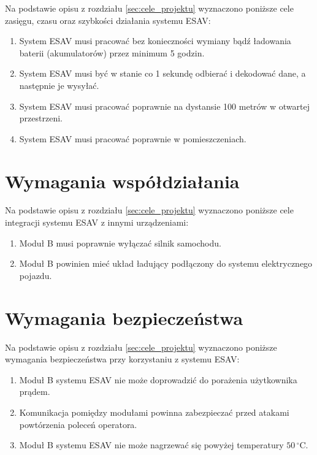 Na podstawie opisu z rozdziału \ref{sec:cele_projektu} wyznaczono poniższe cele zasięgu, czasu oraz szybkości działania systemu ESAV:

\begin{enumerate}[label=\thesection.\arabic{*}.,leftmargin=4em]
\item \label{wym_uzyt1} System ESAV musi pracować bez konieczności wymiany bądź ładowania baterii (akumulatorów) przez minimum 5 godzin.
\item \label{wym_uzyt2} System ESAV musi być w stanie co 1 sekundę odbierać i dekodować dane, a następnie je wysyłać.
\item \label{wym_uzyt3} System ESAV musi pracować poprawnie na dystansie 100 metrów w otwartej przestrzeni.
\item \label{wym_uzyt4} System ESAV musi pracować poprawnie w pomieszczeniach.
\end{enumerate}


\section{Wymagania współdziałania}
\label{sec:wymagania_wspoldzialania}

Na podstawie opisu z rozdziału \ref{sec:cele_projektu} wyznaczono poniższe cele integracji systemu ESAV z innymi urządzeniami:

\begin{enumerate}[label=\thesection.\arabic{*}.,leftmargin=4em]
\item \label{wym_wsp1} Moduł B musi poprawnie wyłączać silnik samochodu.
\item \label{wym_wsp2} Moduł B powinien mieć układ ładujący podłączony do systemu elektrycznego pojazdu.
\end{enumerate}


\section{Wymagania bezpieczeństwa}
\label{sec:wymagania_bezpieczenstwa}

Na podstawie opisu z rozdziału \ref{sec:cele_projektu} wyznaczono poniższe wymagania bezpieczeństwa przy korzystaniu z systemu ESAV:
\begin{enumerate}[label=\thesection.\arabic{*}.,leftmargin=4em]
\item \label{wym_bezp1} Moduł B systemu ESAV nie może doprowadzić do porażenia użytkownika prądem.
\item \label{wym_bezp2} Komunikacja pomiędzy modułami powinna zabezpieczać przed atakami powtórzenia poleceń operatora.
\item \label{wym_bezp3} Moduł B systemu ESAV nie może nagrzewać się powyżej temperatury $50\,^{\circ}\mathrm{C}$.
\end{enumerate}

